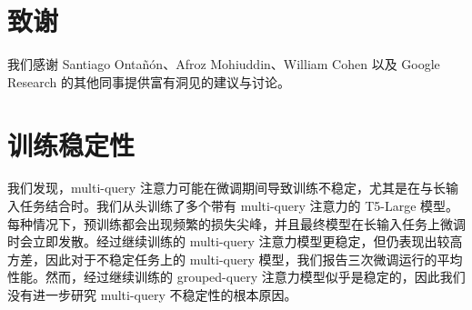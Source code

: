 \documentclass[11pt]{article}
\begin{document}
\section*{致谢}
我们感谢 Santiago Onta\~{n}\'{o}n、Afroz Mohiuddin、William Cohen 以及 Google Research 的其他同事提供富有洞见的建议与讨论。





\clearpage
\appendix

\section{训练稳定性}

我们发现，multi-query 注意力可能在微调期间导致训练不稳定，尤其是在与长输入任务结合时。我们从头训练了多个带有 multi-query 注意力的 T5-Large 模型。每种情况下，预训练都会出现频繁的损失尖峰，并且最终模型在长输入任务上微调时会立即发散。经过继续训练的 multi-query 注意力模型更稳定，但仍表现出较高方差，因此对于不稳定任务上的 multi-query 模型，我们报告三次微调运行的平均性能。然而，经过继续训练的 grouped-query 注意力模型似乎是稳定的，因此我们没有进一步研究 multi-query 不稳定性的根本原因。
\end{document}

